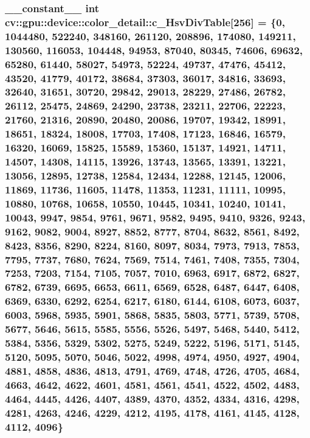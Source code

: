 \hypertarget{namespacecv_1_1gpu_1_1device_1_1color__detail_a4b72f07cdf038e68528bcf73c1eb53f9}{
\subsubsection[{c\-\_\-\-Hsv\-Div\-Table}]{\setlength{\rightskip}{0pt plus 5cm}\-\_\-\-\_\-constant\-\_\-\-\_\- int cv\-::gpu\-::device\-::color\-\_\-detail\-::c\-\_\-\-Hsv\-Div\-Table\mbox{[}256\mbox{]} = \{0, 1044480, 522240, 348160, 261120, 208896, 174080, 149211, 130560, 116053, 104448, 94953, 87040, 80345, 74606, 69632, 65280, 61440, 58027, 54973, 52224, 49737, 47476, 45412, 43520, 41779, 40172, 38684, 37303, 36017, 34816, 33693, 32640, 31651, 30720, 29842, 29013, 28229, 27486, 26782, 26112, 25475, 24869, 24290, 23738, 23211, 22706, 22223, 21760, 21316, 20890, 20480, 20086, 19707, 19342, 18991, 18651, 18324, 18008, 17703, 17408, 17123, 16846, 16579, 16320, 16069, 15825, 15589, 15360, 15137, 14921, 14711, 14507, 14308, 14115, 13926, 13743, 13565, 13391, 13221, 13056, 12895, 12738, 12584, 12434, 12288, 12145, 12006, 11869, 11736, 11605, 11478, 11353, 11231, 11111, 10995, 10880, 10768, 10658, 10550, 10445, 10341, 10240, 10141, 10043, 9947, 9854, 9761, 9671, 9582, 9495, 9410, 9326, 9243, 9162, 9082, 9004, 8927, 8852, 8777, 8704, 8632, 8561, 8492, 8423, 8356, 8290, 8224, 8160, 8097, 8034, 7973, 7913, 7853, 7795, 7737, 7680, 7624, 7569, 7514, 7461, 7408, 7355, 7304, 7253, 7203, 7154, 7105, 7057, 7010, 6963, 6917, 6872, 6827, 6782, 6739, 6695, 6653, 6611, 6569, 6528, 6487, 6447, 6408, 6369, 6330, 6292, 6254, 6217, 6180, 6144, 6108, 6073, 6037, 6003, 5968, 5935, 5901, 5868, 5835, 5803, 5771, 5739, 5708, 5677, 5646, 5615, 5585, 5556, 5526, 5497, 5468, 5440, 5412, 5384, 5356, 5329, 5302, 5275, 5249, 5222, 5196, 5171, 5145, 5120, 5095, 5070, 5046, 5022, 4998, 4974, 4950, 4927, 4904, 4881, 4858, 4836, 4813, 4791, 4769, 4748, 4726, 4705, 4684, 4663, 4642, 4622, 4601, 4581, 4561, 4541, 4522, 4502, 4483, 4464, 4445, 4426, 4407, 4389, 4370, 4352, 4334, 4316, 4298, 4281, 4263, 4246, 4229, 4212, 4195, 4178, 4161, 4145, 4128, 4112, 4096\}}}\label{namespacecv_1_1gpu_1_1device_1_1color__detail_a4b72f07cdf038e68528bcf73c1eb53f9}
